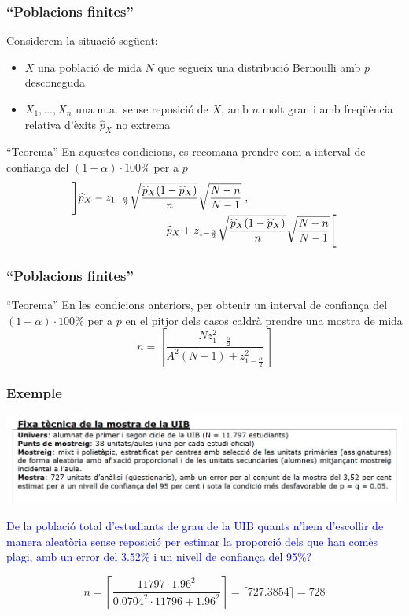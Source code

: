 \documentclass[12pt,t]{beamer}
\newcommand{\blue}[1]{\textcolor{blue}{#1}}
\theoremstyle{plain}
\theoremstyle{definition}
\begin{document}
\begin{frame}
\frametitle{``Poblacions finites''}
\vspace*{-2ex}

Considerem  la situació següent:
\begin{itemize}
\item  $X$ una població de mida $N$ que segueix una distribució Bernoulli amb $p$ desconeguda

\item $X_1,\ldots,X_n$ una m.a.\ sense reposició de $X$, amb $n$ molt gran  i amb freqüència relativa d'èxits $\widehat{p}_{X}$ no extrema
\end{itemize}
\medskip

\begin{block}{``Teorema''}
En aquestes condicions, es recomana prendre com a interval  de confiança del $(1-\alpha)\cdot 100\%$ per a $p$
$$
\begin{array}{l}
\displaystyle \left]\widehat{p}_{X}-z_{1-\frac{\alpha}{2}}\sqrt{\frac{\widehat{p}_{X}
(1-\widehat{p}_{X})}{n}}\sqrt{\frac{N-n}{N-1}}\right.,\\[1ex]
\hspace*{3cm}\displaystyle
\left.\widehat{p}_{X}+z_{1-\frac{\alpha}{2}}\sqrt{\frac{\widehat{p}_{X}
(1-\widehat{p}_{X})}{n}}\sqrt{\frac{N-n}{N-1}}\right[
\end{array}$$
\end{block}
\end{frame}


\begin{frame}
\frametitle{``Poblacions finites''}

\begin{block}{``Teorema''}
En les condicions anteriors, per obtenir un interval de confiança del $(1-\alpha)\cdot 100\%$ per a $p$ en el pitjor dels casos caldrà prendre una mostra de mida
$$
n=\left\lceil\frac{Nz_{1-\frac{\alpha}{2}}^2}{A^2(N-1)+z_{1-\frac{\alpha}{2}}^2}\right\rceil
$$
\end{block}
\end{frame}

\begin{frame}
\frametitle{Exemple}
\vspace*{-5ex}

\begin{center}
\hspace*{-0.5cm}\includegraphics[width=1.1\linewidth]{plagiUIB2.jpg}
\end{center}

\blue{De la població total d'estudiants de grau de la UIB quants n'hem d'escollir de manera aleatòria sense reposició per estimar la proporció dels que han comès plagi, amb un error del 3.52\% i un nivell de confiança del 95\%?}
\pause

$$
n=\left\lceil\frac{11797\cdot 1.96^2}{0.0704^2\cdot 11796+1.96^2}\right\rceil=\lceil 727.3854\rceil=728
$$
\end{frame}
\end{document}
